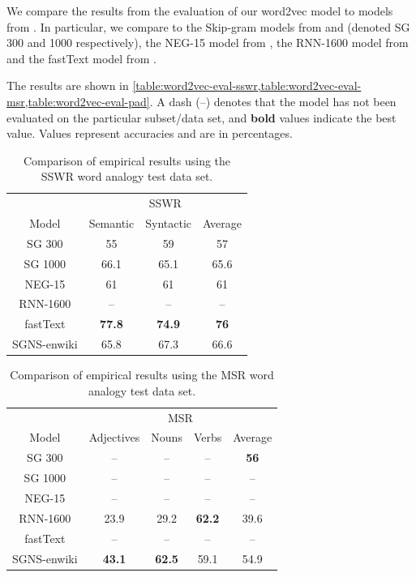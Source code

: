 We compare the results from the evaluation of our word2vec model to models from \cite{mikolov2013a, mikolov2013b, mikolov-etal-2013-linguistic, bojanowski2017enriching}. In particular, we compare to the Skip-gram models from \cite[Table 3]{mikolov2013a} and \cite[Table 6]{mikolov2013a} (denoted SG 300 and 1000 respectively), the NEG-15 model from \cite[Table 1 and 3]{mikolov2013b}, the RNN-1600 model from \cite[Table 2]{mikolov-etal-2013-linguistic} and the fastText model from \cite[Table 2]{bojanowski2017enriching}.

The results are shown in \cref{table:word2vec-eval-sswr,table:word2vec-eval-msr,table:word2vec-eval-pad}. A dash (--) denotes that the model has not been evaluated on the particular subset/data set, and \textbf{bold} values indicate the best value. Values represent accuracies and are in percentages.
\begin{table}[H]
    \centering
    \begin{tabular}{@{}cccc@{}}
    \toprule
    & \multicolumn{3}{c}{SSWR} \\ \cmidrule(l){2-4}
    \multirow{-2}{*}{Model} & Semantic & Syntactic & Average \\ \midrule
    \trcolor
    SG 300 & 55 & 59 & 57 \\
    SG 1000 & 66.1 & 65.1 & 65.6 \\
    \trcolor
    NEG-15 & 61 & 61 & 61 \\
    RNN-1600 & -- & -- & -- \\
    \trcolor
    fastText & \textbf{77.8} & \textbf{74.9} & \textbf{76} \\
    SGNS-enwiki & 65.8 & 67.3 & 66.6 \\
    \bottomrule
    \end{tabular}
    \caption{Comparison of empirical results using the SSWR word analogy test data set.}
    \label{table:word2vec-eval-sswr}
\end{table}
\begin{table}[H]
     \centering
    \begin{tabular}{@{}ccccc@{}}
    \toprule
    & \multicolumn{4}{c}{MSR} \\
    \cmidrule(l){2-5} 
    \multirow{-2}{*}{Model} & Adjectives & Nouns & Verbs & Average \\
    \midrule
    \trcolor
    SG 300 & -- & -- & -- & \textbf{56} \\
    SG 1000 & -- & -- & -- & -- \\
    \trcolor
    NEG-15 & -- & -- & -- & -- \\
    RNN-1600 & 23.9 & 29.2 & \textbf{62.2} & 39.6 \\
    \trcolor
    fastText & -- & -- & -- & -- \\
    SGNS-enwiki & \textbf{43.1} & \textbf{62.5} & 59.1 & 54.9 \\
    \bottomrule
    \end{tabular}
    \caption{Comparison of empirical results using the MSR word analogy test data set.}
    \label{table:word2vec-eval-msr}
\end{table}

